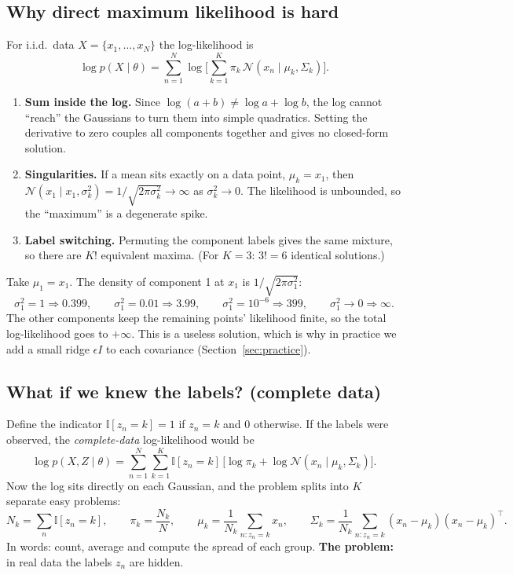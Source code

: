 \documentclass[11pt,a4paper]{article}
\newcommand{\N}{\mathcal{N}}
\newcommand{\Ind}{\mathbb{I}}
\begin{document}
\subsection{Why direct maximum likelihood is hard}

For i.i.d.\ data $X=\{x_1,\dots,x_N\}$ the log-likelihood is
\[
\log p(X\mid\theta)=\sum_{n=1}^N\log\Big[\sum_{k=1}^K\pi_k\,\N(x_n\mid\mu_k,\Sigma_k)\Big].
\]
\begin{enumerate}[leftmargin=*]
\item \textbf{Sum inside the log.} Since $\log(a+b)\neq\log a+\log b$, the log cannot ``reach'' the Gaussians to turn them into simple quadratics. Setting the derivative to zero couples all components together and gives no closed-form solution.
\item \textbf{Singularities.} If a mean sits exactly on a data point, $\mu_k=x_1$, then $\N(x_1\mid x_1,\sigma_k^2)=1/\sqrt{2\pi\sigma_k^2}\to\infty$ as $\sigma_k^2\to 0$. The likelihood is unbounded, so the ``maximum'' is a degenerate spike.
\item \textbf{Label switching.} Permuting the component labels gives the same mixture, so there are $K!$ equivalent maxima. (For $K=3$: $3!=6$ identical solutions.)
\end{enumerate}

\begin{example}
Take $\mu_1=x_1$. The density of component 1 at $x_1$ is $1/\sqrt{2\pi\sigma_1^2}$:
\[
\sigma_1^2=1\Rightarrow0.399,\qquad \sigma_1^2=0.01\Rightarrow3.99,\qquad \sigma_1^2=10^{-6}\Rightarrow399,\qquad\sigma_1^2\to0\Rightarrow\infty.
\]
The other components keep the remaining points' likelihood finite, so the total log-likelihood goes to $+\infty$. This is a useless solution, which is why in practice we add a small ridge $\epsilon I$ to each covariance (Section~\ref{sec:practice}).
\end{example}

\subsection{What if we knew the labels? (complete data)}

Define the indicator $\Ind[z_n=k]=1$ if $z_n=k$ and $0$ otherwise. If the labels were observed, the \emph{complete-data} log-likelihood would be
\[
\log p(X,Z\mid\theta)=\sum_{n=1}^N\sum_{k=1}^K\Ind[z_n=k]\,\big[\log\pi_k+\log\N(x_n\mid\mu_k,\Sigma_k)\big].
\]
Now the log sits directly on each Gaussian, and the problem splits into $K$ separate easy problems:
\[
N_k=\sum_n\Ind[z_n=k],\qquad \pi_k=\frac{N_k}{N},\qquad \mu_k=\frac{1}{N_k}\sum_{n:z_n=k}x_n,\qquad \Sigma_k=\frac{1}{N_k}\sum_{n:z_n=k}(x_n-\mu_k)(x_n-\mu_k)^\top.
\]
In words: count, average and compute the spread of each group. \textbf{The problem:} in real data the labels $z_n$ are hidden.
\end{document}
